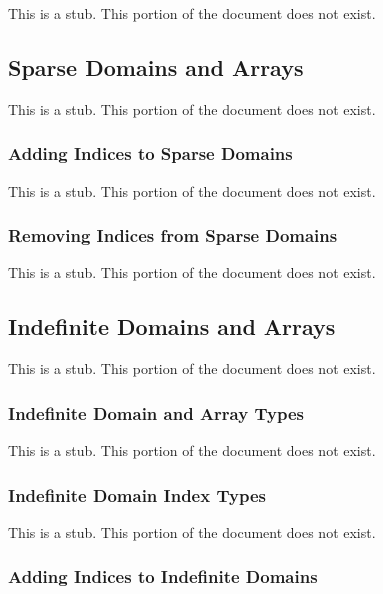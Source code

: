 This is a stub.  This portion of the document does not exist.

\subsection{Sparse Domains and Arrays}
\label{Sparse_Domains_and_Arrays}

This is a stub.  This portion of the document does not exist.

\subsubsection{Adding Indices to Sparse Domains}
\label{Adding_Indices_to_Sparse_Domains}

This is a stub.  This portion of the document does not exist.

\subsubsection{Removing Indices from Sparse Domains}
\label{Removing_Indices_from_Sparse_Domains}

This is a stub.  This portion of the document does not exist.

\subsection{Indefinite Domains and Arrays}
\label{Indefinite_Domains_and_Arrays}

This is a stub.  This portion of the document does not exist.

\subsubsection{Indefinite Domain and Array Types}
\label{Indefinite_Domain_and_Array_Types}

This is a stub.  This portion of the document does not exist.

\subsubsection{Indefinite Domain Index Types}
\label{Indefinite_Domain_Index_Types}

This is a stub.  This portion of the document does not exist.

\subsubsection{Adding Indices to Indefinite Domains}
\label{Adding_Indices_to_Indefinite_Domains}


